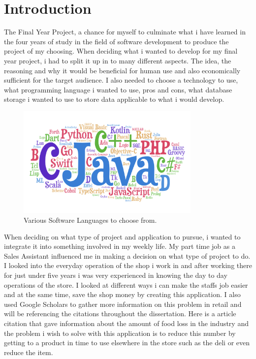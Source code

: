 \chapter{Introduction}
The Final Year Project, a chance for myself to culminate what i have learned in the four years of study in the field of software development to produce the project of my choosing. When deciding what i wanted to develop for my final year project, i had to split it up in to many different aspects. The idea, the reasoning and why it would be beneficial for human use and also economically sufficient for the target audience. I also needed to choose a technology to use, what programming language i wanted to use, pros and cons, what database storage i wanted to use to store data applicable to what i would develop.  

\begin{figure}[h!]
	\caption{Various Software Languages to choose from.}
	\label{image:progLanguages}
	\centering
	\includegraphics[width=0.8\textwidth]{images/progLanguages.png}
\end{figure}	

\newpage

When deciding on what type of project and application to pursue, i wanted to integrate it into something involved in my weekly life. My part time job as a Sales Assistant influenced  me in making a decision on what type of project to do. I looked into the everyday operation of the shop i work in and after working there for just under five years i was very experienced in knowing the day to day operations of the store. I looked at different ways i can make the staffs job easier and at the same time, save the shop money by creating this application. I also used Google Scholars to gather more information on this problem in retail and will be referencing the citations throughout the dissertation. Here is a article citation that gave information about the amount of food loss in the industry and the problem i wish to solve with this application is to reduce this number by getting to a product in time to use elsewhere in the store such as the deli or even reduce the item. \cite{lebersorger2014food}
\newline

